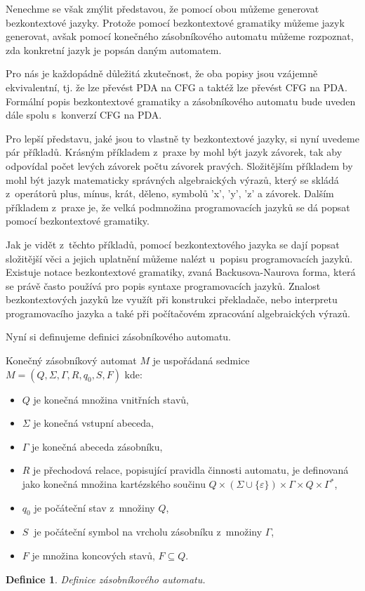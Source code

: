 Nenechme se však zmýlit představou, že pomocí obou můžeme generovat bezkontextové jazyky. Protože pomocí bezkontextové gramatiky můžeme jazyk generovat, avšak pomocí konečného zásobníkového automatu můžeme rozpoznat, zda konkretní jazyk je popsán daným automatem. 

Pro nás je každopádně důležitá zkutečnost, že oba popisy jsou vzájemně ekvivalentní, tj. že lze převést PDA na CFG a taktéž lze převést CFG na PDA. Formální popis bezkontextové gramatiky a zásobníkového automatu bude uveden dále spolu s~konverzí CFG na PDA. 

Pro lepší představu, jaké jsou to vlastně ty bezkontextové jazyky, si nyní uvedeme pár příkladů. Krásným příkladem z~praxe by mohl být jazyk závorek, tak aby odpovídal počet levých závorek počtu závorek pravých. Složitějším příkladem by mohl být jazyk matematicky správných algebraických výrazů, který se skládá z~operátorů plus, mínus, krát, děleno, symbolů 'x', 'y', 'z' a závorek. Dalším příkladem z~praxe je, že velká podmnožina programovacích jazyků se dá popsat pomocí bezkontextové gramatiky. 

Jak je vidět z~těchto příkladů, pomocí bezkontextového jazyka se dají popsat složitější věci a jejich uplatnění můžeme nalézt u~popisu programovacích jazyků. Existuje notace bezkontextové gramatiky, zvaná Backusova-Naurova forma, která se právě často používá pro popis syntaxe programovacích jazyků. Znalost bezkontextových jazyků lze využít při konstrukci překladače, nebo interpretu programovacího jazyka a také při počítačovém zpracování algebraických výrazů. \cite{CFL}

\newtheorem{mydef}{Definice}
\newtheorem{myAlgorithm}{Algoritmus}

Nyní si definujeme definici zásobníkového automatu. \cite{PDA}

\begin{framed}
	\begin{flushleft}Konečný zásobníkový automat \( M \) je uspořádaná sedmice \( M = (Q, \Sigma, \Gamma, R, q_0, S, F) \) kde:\end{flushleft}
	\begin{itemize}
		\item \( Q \) je konečná množina vnitřních stavů,
		\item \( \Sigma \) je konečná vstupní abeceda,
		\item \( \Gamma \) je konečná abeceda zásobníku,
		\item \( R \) je přechodová relace, popisující pravidla činnosti automatu, je definovaná jako konečná množina kartézského součinu \( Q \times (\Sigma \cup \{\varepsilon\} ) \times \Gamma \times Q \times \Gamma^* \),
		\item \( q_0 \) je počáteční stav z~množiny \( Q \),
		\item \( S~\) je počáteční symbol na vrcholu zásobníku z~množiny \( \Gamma \),
		\item \( F \) je množina koncových stavů, \( F \subseteq Q \).
	\end{itemize}
\end{framed}
\begin{mydef}
	Definice zásobníkového automatu.
\end{mydef}

